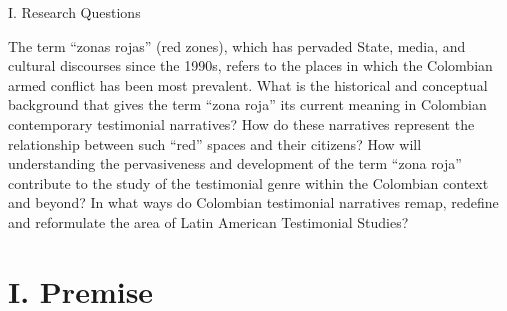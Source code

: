 \documentclass[
  11pt,
,
onecolumn,
openany
]{book}
\begin{document}
I. Research Questions

The term ``zonas rojas'' (red zones), which has pervaded State, media, and
cultural discourses since the 1990s, refers to the places in which the
Colombian armed conflict has been most prevalent. What is the historical and
conceptual background that gives the term ``zona roja'' its current meaning in
Colombian contemporary testimonial narratives? How do these narratives
represent the relationship between such ``red'' spaces and their citizens? How
will understanding the pervasiveness and development of the term ``zona roja''
contribute to the study of the testimonial genre within the Colombian context
and beyond? In what ways do Colombian testimonial narratives remap, redefine
and reformulate the area of Latin American Testimonial Studies?

\hypertarget{i.-premise}{%
\chapter{I. Premise}\label{i.-premise}}
\end{document}

